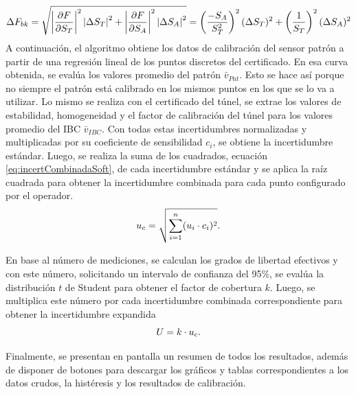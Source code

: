 \begin{equation}
    \centering
    \Delta F_{bk} =  \sqrt{\left\lvert \frac{\partial F}{\partial S_T} \right\rvert^2 \left\lvert\Delta S_T\right\rvert^2 + \left\lvert \frac{\partial F}{\partial S_A} \right\rvert^2 \left\lvert\Delta S_A\right\rvert^2} = \left( \frac{-S_{A}}{S_{T}^{2}} \right)^2 (\Delta S_T)^2 + \left( \frac{1}{S_{T}} \right)^2 (\Delta S_A)^2
    \label{eq:incertiFactorBloqueo}
\end{equation}
A continuación, el algoritmo obtiene los datos de calibración del sensor patrón a partir de una regresión lineal de los puntos discretos del certificado. En esa curva obtenida, se evalúa los valores promedio del patrón $\bar{v}_{Pat}$. Esto se hace así porque no siempre el patrón está calibrado en los mismos puntos en los que se lo va a utilizar. Lo mismo se realiza con el certificado del túnel, se extrae los valores de estabilidad, homogeneidad y el factor de calibración del túnel para los valores promedio del IBC $\bar{v}_{IBC}$. Con todas estas incertidumbres normalizadas y multiplicadas por su coeficiente de sensibilidad $c_{i}$, se obtiene la incertidumbre estándar. Luego, se realiza la suma de los cuadrados, ecuación \ref{eq:incertCombinadaSoft}, de cada incertidumbre estándar y se aplica la raíz cuadrada para obtener la incertidumbre combinada para cada punto configurado por el operador.
\begin{equation}
    \centering
    u_c = \sqrt{\sum_{i=1}^{n} (u_{i} \cdot c_{i})^2}.
\label{eq:incertCombinadaSoft}
\end{equation}

En base al número de mediciones, se calculan los grados de libertad efectivos y con este número, solicitando un intervalo de confianza del 95\%, se evalúa la distribución $t$ de Student para obtener el factor de cobertura $k$. Luego, se multiplica este número por cada incertidumbre combinada correspondiente para obtener la incertidumbre expandida 
\begin{equation}
    \centering
    U = k \cdot u_c.
\label{eq:incertExpandidaSoft}
\end{equation}

Finalmente, se presentan en pantalla un resumen de todos los resultados, además de disponer de botones para descargar los gráficos y tablas correspondientes a los datos crudos, la histéresis y los resultados de calibración.


